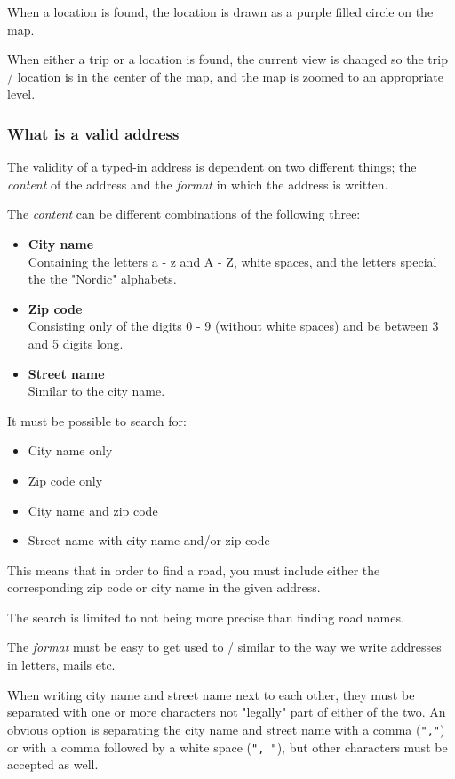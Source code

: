 When a location is found, the location is drawn as a purple filled circle on the map.

When either a trip or a location is found, the current view is changed so the trip / location is in the center of the map, and the map is zoomed to an appropriate level.

\subsubsection{What is a valid address}
\label{sec: What is a valid address}
\label{sec:What is a valid address}
The validity of a typed-in address is dependent on two different things; the \textit{content} of the address and the \textit{format} in which the address is written.

The \textit{content} can be different combinations of the following three:
\begin{itemize}
	\item \textbf{City name} \\
		Containing the letters a - z and A - Z, white spaces, and the letters special the the "Nordic" alphabets.
	\item \textbf{Zip code} \\
		Consisting only of the digits 0 - 9 (without white spaces) and be between 3 and 5 digits long.
	\item \textbf{Street name} \\
		Similar to the city name.
\end{itemize}
It must be possible to search for:
\begin{itemize}
	\item City name only
	\item Zip code only
	\item City name and zip code
	\item Street name with city name and/or zip code
\end{itemize}
This means that in order to find a road, you must include either the corresponding zip code or city name in the given address.

The search is limited to not being more precise than finding road names.

The \textit{format} must be easy to get used to / similar to the way we write addresses in letters, mails etc.

When writing city name and street name next to each other, they must be separated with one or more characters not "legally" part of either of the two. An obvious option is separating the city name and street name with a comma (\texttt{","}) or with a comma followed by a white space (\texttt{", "}), but other characters must be accepted as well.

